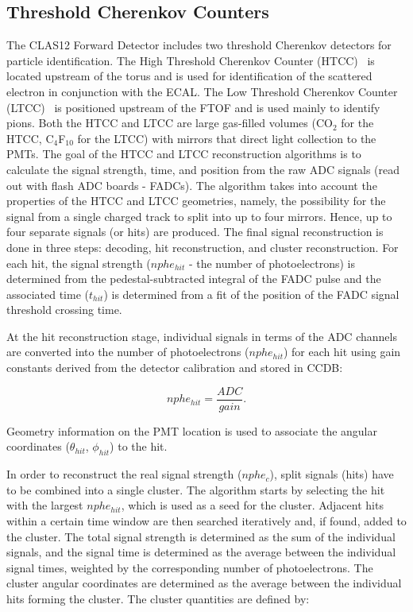 \subsection{Threshold Cherenkov Counters}

The CLAS12 Forward Detector includes two threshold Cherenkov detectors for particle identification. The
High Threshold Cherenkov Counter (HTCC)~\cite{htcc-nim} is located upstream of the torus and is used for
identification of the scattered electron in conjunction with the ECAL. The Low Threshold Cherenkov Counter
(LTCC)~\cite{ltcc-nim} is positioned upstream of the FTOF and is used mainly to {\color{red} identify pions}.
Both the HTCC and LTCC are large gas-filled volumes (CO$_2$ for the HTCC, C$_4$F$_{10}$ for the LTCC)
with mirrors that direct light collection to the PMTs. The goal of the HTCC and LTCC reconstruction algorithms
is to calculate the signal strength, time, and position from the raw ADC signals (read out with flash ADC boards
- FADCs). The algorithm takes into account the properties of the HTCC and LTCC geometries, namely, the
possibility for the signal from a single charged track to split into up to four mirrors. Hence, up to four separate
signals (or hits) are produced. The final signal reconstruction is done in three steps: decoding, hit reconstruction,
and cluster reconstruction. For each hit, the signal strength ($nphe_{hit}$ - the number of photoelectrons) is
determined from the pedestal-subtracted integral of the FADC pulse and the associated time ($t_{hit}$) is
determined from a fit of the position of the FADC signal threshold crossing time.

At the hit reconstruction stage, individual signals in terms of the ADC channels are converted into the number of
photoelectrons ($nphe_{hit}$) for each hit using gain constants derived from the detector calibration and stored
in CCDB:

\begin{equation}
nphe_{hit} = \frac{ADC}{gain}.
\end{equation}

\noindent
Geometry information on the PMT location is used to associate the angular coordinates ($\theta_{hit}$, $\phi_{hit}$)
to the hit.

In order to reconstruct the real signal strength ($nphe_c$), split signals (hits) have to be combined into a single
cluster. The algorithm starts by selecting the hit with the largest $nphe_{hit}$, which is used as a seed for the
cluster. Adjacent hits within a certain time window are then searched iteratively and, if found, added to the
cluster. The total signal strength is determined as the sum of the individual signals, and the signal time is
determined as the average between the individual signal times, weighted by the corresponding number of
photoelectrons. The cluster angular coordinates are determined as the average between the individual hits forming
the cluster. The cluster quantities are defined by:


